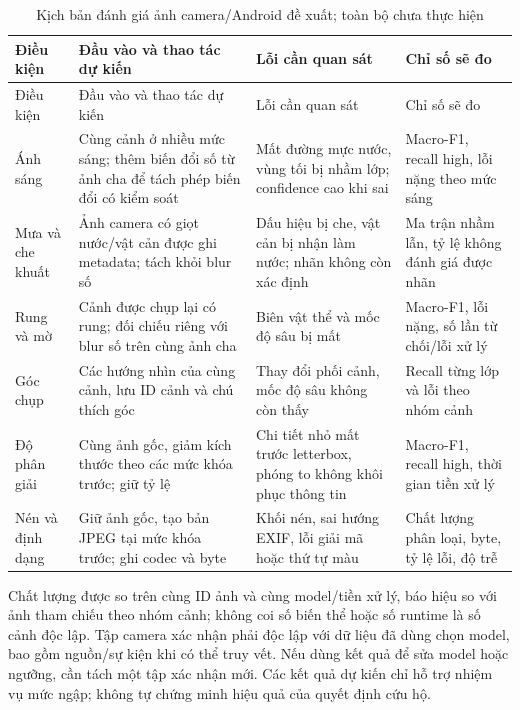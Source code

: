 \begin{longtable}{P{.14\textwidth}P{.28\textwidth}P{.26\textwidth}P{.21\textwidth}}
\caption{Kịch bản đánh giá ảnh camera/Android đề xuất; toàn bộ chưa thực hiện}\label{tab:camera-scenarios-plan}\\
\toprule Điều kiện & Đầu vào và thao tác dự kiến & Lỗi cần quan sát & Chỉ số sẽ đo \\\midrule\endfirsthead
\toprule Điều kiện & Đầu vào và thao tác dự kiến & Lỗi cần quan sát & Chỉ số sẽ đo \\\midrule\endhead
Ánh sáng & Cùng cảnh ở nhiều mức sáng; thêm biến đổi số từ ảnh cha để tách phép biến đổi có kiểm soát & Mất đường mực nước, vùng tối bị nhầm lớp; confidence cao khi sai & Macro-F1, recall high, lỗi nặng theo mức sáng \\
Mưa và che khuất & Ảnh camera có giọt nước/vật cản được ghi metadata; tách khỏi blur số & Dấu hiệu bị che, vật cản bị nhận làm nước; nhãn không còn xác định & Ma trận nhầm lẫn, tỷ lệ không đánh giá được nhãn \\
Rung và mờ & Cảnh được chụp lại có rung; đối chiếu riêng với blur số trên cùng ảnh cha & Biên vật thể và mốc độ sâu bị mất & Macro-F1, lỗi nặng, số lần từ chối/lỗi xử lý \\
Góc chụp & Các hướng nhìn của cùng cảnh, lưu ID cảnh và chú thích góc & Thay đổi phối cảnh, mốc độ sâu không còn thấy & Recall từng lớp và lỗi theo nhóm cảnh \\
Độ phân giải & Cùng ảnh gốc, giảm kích thước theo các mức khóa trước; giữ tỷ lệ & Chi tiết nhỏ mất trước letterbox, phóng to không khôi phục thông tin & Macro-F1, recall high, thời gian tiền xử lý \\
Nén và định dạng & Giữ ảnh gốc, tạo bản JPEG tại mức khóa trước; ghi codec và byte & Khối nén, sai hướng EXIF, lỗi giải mã hoặc thứ tự màu & Chất lượng phân loại, byte, tỷ lệ lỗi, độ trễ \\
\bottomrule
\end{longtable}

Chất lượng được so trên cùng ID ảnh và cùng model/tiền xử lý, báo hiệu so với ảnh tham chiếu theo nhóm cảnh; không coi số biến thể hoặc số runtime là số cảnh độc lập. Tập camera xác nhận phải độc lập với dữ liệu đã dùng chọn model, bao gồm nguồn/sự kiện khi có thể truy vết. Nếu dùng kết quả để sửa model hoặc ngưỡng, cần tách một tập xác nhận mới. Các kết quả dự kiến chỉ hỗ trợ nhiệm vụ mức ngập; không tự chứng minh hiệu quả của quyết định cứu hộ.


